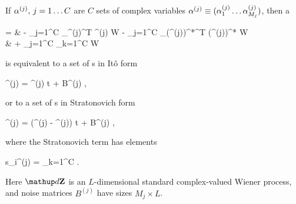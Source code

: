 \begin{theorem}
\label{thm:fpe-sde:corr:mc-fpe-sde}
	If $\mathbf{\alpha}^{(j)},\, j = 1 \ldots C$ are $C$ sets of complex variables $\mathbf{\alpha}^{(j)} \equiv (\alpha_1^{(j)} \ldots \alpha_{M_j}^{(j)})$, then a 
	\begin{eqn*}
		={} & - \sum_{j=1}^C \vcwd_{\balpha^{(j)}}^T \avec^{(j)} W
		- \sum_{j=1}^C \vcwd_{(\balpha^{(j)})^*}^T (\avec^{(j)})^* W \\
		& + \sum_{j=1}^C \sum_{k=1}^C
			 W
	\end{eqn*}
	is equivalent to a set of s in It\^{o} form
	\begin{eqn*}
		\upd\balpha^{(j)} = \avec^{(j)} \upd t + B^{(j)} \upd\Zvec,
	\end{eqn*}
	or to a set of s in Stratonovich form
	\begin{eqn*}
		\upd\balpha^{(j)} = (\avec^{(j)} - \svec^{(j)}) \upd t + B^{(j)} \upd\Zvec,
	\end{eqn*}
	where the Stratonovich term has elements
	\begin{eqn*}
		s_i^{(j)} =  \sum_{k=1}^C
			\Trace{ (B^{(k)})^H \vcwd_{(\balpha^{(k)})^*} \evec_i^T B^{(j)} }.
	\end{eqn*}
	Here $\upd\Zvec$ is an $L$-dimensional standard complex-valued Wiener process, and noise matrices $B^{(j)}$ have sizes $M_j \times L$.
\end{theorem}
